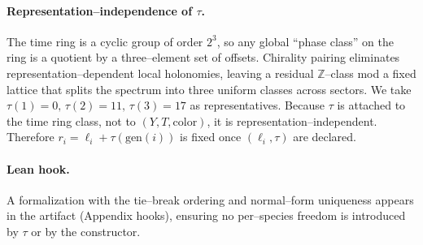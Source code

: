 \documentclass[epjc3]{svjour3}
\begin{document}
\paragraph{Representation–independence of $\tau$.} The time ring is a cyclic group of order $2^3$, so any global “phase class” on the ring is a quotient by a three–element set of offsets. Chirality pairing eliminates representation–dependent local holonomies, leaving a residual $\mathbb{Z}$–class mod a fixed lattice that splits the spectrum into three uniform classes across sectors. We take $\tau(1)=0,\,\tau(2)=11,\,\tau(3)=17$ as representatives. Because $\tau$ is attached to the time ring class, not to $(Y,T,\text{color})$, it is representation–independent. Therefore $r_i=\ell_i+\tau(\mathrm{gen}(i))$ is fixed once $(\ell_i,\tau)$ are declared.

\paragraph{Lean hook.} A formalization with the tie–break ordering and normal–form uniqueness appears in the artifact (Appendix hooks), ensuring no per–species freedom is introduced by $\tau$ or by the constructor.

\section*{}
\end{document}
